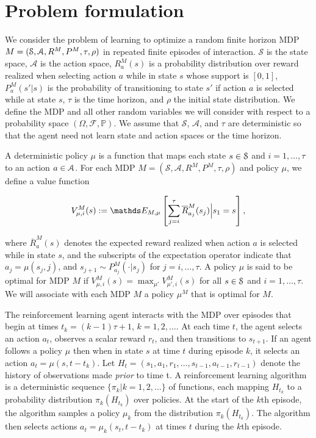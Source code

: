 \section{Problem formulation}

We consider the problem of learning to optimize a random finite horizon MDP $M = (\mathcal{S}, \mathcal{A}, R^M, P^M, \tau, \rho)$ in repeated finite episodes of interaction. $\mathcal{S}$ is the state space, $\mathcal{A}$ is the action space, $R^M_a(s)$ is a probability distribution over reward realized when selecting action $a$ while in state $s$ whose support is $[0,1]$, $P^M_a(s'|s)$ is the probability of transitioning to state $s'$ if action $a$ is selected while at state $s$, $\tau$ is the time horizon, and $\rho$ the initial state distribution.  
We define the MDP and all other random variables we will consider with respect to a probability space $(\Omega, \mathcal{F}, \mathbb{P})$.  We assume that $\mathcal{S}$, $\mathcal{A}$, and $\tau$ are deterministic so that the agent need not learn state and action spaces or the time horizon.

A deterministic policy $\mu$ is a function that maps each state $s \in \mathcal{S}$ and $i = 1,\ldots,\tau$ to an action $a \in \mathcal{A}$.
For each MDP $M = (\mathcal{S}, \mathcal{A}, R^M, P^M, \tau, \rho)$ and policy $\mu$, we define a value function

$$V^{M}_{\mu, i}(s) := \Exp_{M,\mu}\left[ \sum_{j=i}^{\tau} \overline{R}^M_{a_j}(s_j) \Big| s_1 = s \right],$$

where $\overline{R}^M_a(s)$ denotes the expected reward realized when action $a$ is selected while in state $s$, and the subscripts of the expectation operator indicate that $a_j = \mu(s_j, j)$, and $s_{j+1} \sim P^M_{a_j}(\cdot| s_j)$ for $j = i, \ldots, \tau$.  A policy $\mu$ is said to be optimal for MDP $M$ if $V^{M}_{\mu, i}(s) = \max_{\mu'} V^{M}_{\mu', i}(s)$ for all $s \in \mathcal{S}$ and $i=1,\ldots,\tau$. We will associate with each MDP $M$ a policy $\mu^M$ that is optimal for $M$. 

The reinforcement learning agent interacts with the MDP over episodes that begin at times $t_k = (k-1) \tau + 1$, $k=1,2,\ldots$.
At each time $t$, the agent selects an action $a_t$, observes a scalar reward $r_t$, and then transitions to $s_{t+1}$.
If an agent follows a policy $\mu$ then when in state $s$ at time $t$ during episode $k$, it selects an action $a_t=\mu(s, t - t_k)$.
Let $H_t = (s_1,a_1,r_1,\ldots,s_{t-1},a_{t-1},r_{t-1})$ denote the history of observations made \emph{prior} to time t.  
A reinforcement learning algorithm is a deterministic sequence $\{\pi_k | k = 1, 2, \ldots\}$ of functions, each mapping $H_{t_k}$ to a probability distribution $\pi_{k}(H_{t_k})$ over policies. At the start of the $k$th episode, the algorithm samples a policy $\mu_{k}$ from the distribution $\pi_{k}(H_{t_k})$. The algorithm then selects actions $a_{t}=\mu_{k}(s_t, t - t_k)$ at times $t$ during the $k$th episode.

